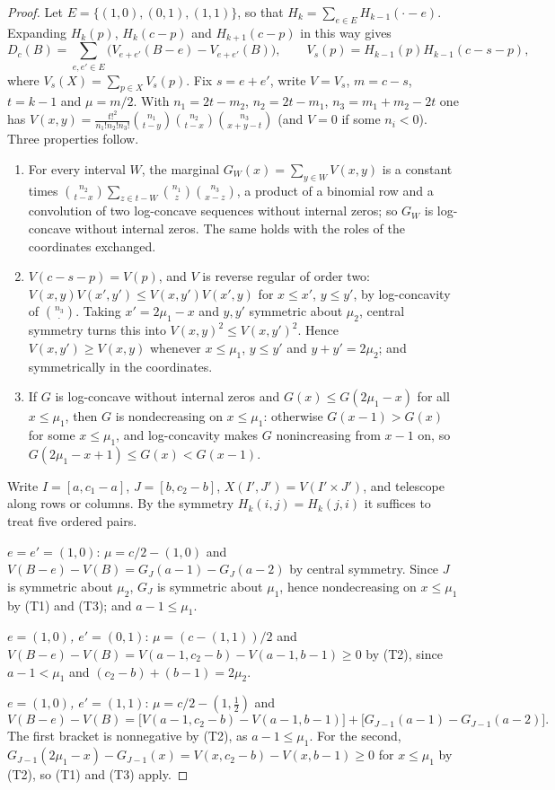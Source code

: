 \begin{proof}
Let $E=\{(1,0),(0,1),(1,1)\}$, so that $H_k=\sum_{e\in E}H_{k-1}(\cdot-e)$. Expanding $H_k(p)$, $H_k(c-p)$ and $H_{k+1}(c-p)$ in this way gives
\[
D_c(B)=\sum_{e,e'\in E}\bigl(V_{e+e'}(B-e)-V_{e+e'}(B)\bigr),\qquad V_s(p)=H_{k-1}(p)H_{k-1}(c-s-p),
\]
where $V_s(X)=\sum_{p\in X}V_s(p)$. Fix $s=e+e'$, write $V=V_s$, $m=c-s$, $t=k-1$ and $\mu=m/2$. With $n_1=2t-m_2$, $n_2=2t-m_1$, $n_3=m_1+m_2-2t$ one has $V(x,y)=\frac{t!^2}{n_1!n_2!n_3!}\binom{n_1}{t-y}\binom{n_2}{t-x}\binom{n_3}{x+y-t}$ (and $V=0$ if some $n_i<0$). Three properties follow.
\begin{enumerate}
\item[(T1)] For every interval $W$, the marginal $G_W(x)=\sum_{y\in W}V(x,y)$ is a constant times $\binom{n_2}{t-x}\sum_{z\in t-W}\binom{n_1}z\binom{n_3}{x-z}$, a product of a binomial row and a convolution of two log-concave sequences without internal zeros; so $G_W$ is log-concave without internal zeros. The same holds with the roles of the coordinates exchanged.
\item[(T2)] $V(c-s-p)=V(p)$, and $V$ is reverse regular of order two: $V(x,y)V(x',y')\leq V(x,y')V(x',y)$ for $x\leq x'$, $y\leq y'$, by log-concavity of $\binom{n_3}{\cdot}$. Taking $x'=2\mu_1-x$ and $y,y'$ symmetric about $\mu_2$, central symmetry turns this into $V(x,y)^2\leq V(x,y')^2$. Hence $V(x,y')\geq V(x,y)$ whenever $x\leq\mu_1$, $y\leq y'$ and $y+y'=2\mu_2$; and symmetrically in the coordinates.
\item[(T3)] If $G$ is log-concave without internal zeros and $G(x)\leq G(2\mu_1-x)$ for all $x\leq\mu_1$, then $G$ is nondecreasing on $x\leq\mu_1$: otherwise $G(x-1)>G(x)$ for some $x\leq\mu_1$, and log-concavity makes $G$ nonincreasing from $x-1$ on, so $G(2\mu_1-x+1)\leq G(x)<G(x-1)$.
\end{enumerate}
Write $I=[a,c_1-a]$, $J=[b,c_2-b]$, $X(I',J')=V(I'\times J')$, and telescope along rows or columns. By the symmetry $H_k(i,j)=H_k(j,i)$ it suffices to treat five ordered pairs.

\emph{$e=e'=(1,0)$}: $\mu=c/2-(1,0)$ and $V(B-e)-V(B)=G_J(a-1)-G_J(a-2)$ by central symmetry. Since $J$ is symmetric about $\mu_2$, $G_J$ is symmetric about $\mu_1$, hence nondecreasing on $x\leq\mu_1$ by (T1) and (T3); and $a-1\leq\mu_1$.

\emph{$e=(1,0)$, $e'=(0,1)$}: $\mu=(c-(1,1))/2$ and $V(B-e)-V(B)=V(a-1,c_2-b)-V(a-1,b-1)\geq0$ by (T2), since $a-1<\mu_1$ and $(c_2-b)+(b-1)=2\mu_2$.

\emph{$e=(1,0)$, $e'=(1,1)$}: $\mu=c/2-(1,\tfrac12)$ and
\[
V(B-e)-V(B)=\bigl[V(a-1,c_2-b)-V(a-1,b-1)\bigr]+\bigl[G_{J-1}(a-1)-G_{J-1}(a-2)\bigr].
\]
The first bracket is nonnegative by (T2), as $a-1\leq\mu_1$. For the second, $G_{J-1}(2\mu_1-x)-G_{J-1}(x)=V(x,c_2-b)-V(x,b-1)\geq0$ for $x\leq\mu_1$ by (T2), so (T1) and (T3) apply.


\end{proof}
